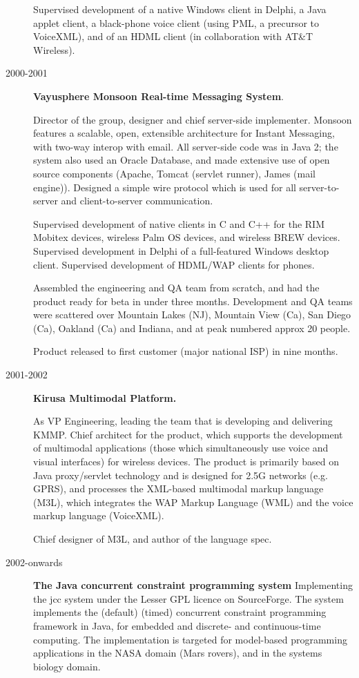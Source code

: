 \documentclass{article}
\begin{document}
\begin{description}
  Supervised development of a native Windows client in Delphi, a Java
  applet client, a black-phone voice client (using PML, a precursor to
  VoiceXML), and of an HDML client (in collaboration with
  AT\&T Wireless).

\item[2000-2001] {\bf Vayusphere Monsoon Real-time Messaging System}.

Director of the group, designer and chief server-side implementer.
  Monsoon features a scalable, open, extensible architecture for
  Instant Messaging, with two-way interop with email. All server-side
  code was in Java 2; the system also used an Oracle Database, and
  made extensive use of open source components (Apache, Tomcat
  (servlet runner), James (mail engine)). Designed a simple wire
  protocol which is used for all server-to-server and client-to-server
  communication.

  Supervised development of native clients in C and C++ for the RIM
  Mobitex devices, wireless Palm OS devices, and wireless BREW
  devices.  Supervised development in Delphi of a full-featured
  Windows desktop client. Supervised development of HDML/WAP clients
  for phones.

  Assembled the engineering and QA team from scratch, and had the
  product ready for beta in under three months.  Development and QA
  teams were scattered over Mountain Lakes (NJ), Mountain View (Ca),
  San Diego (Ca), Oakland (Ca) and Indiana, and at peak numbered
  approx 20 people.

  Product released to first customer (major national ISP) in nine
  months.


 \item[2001-2002] {\bf Kirusa Multimodal Platform.}

 As VP Engineering, leading the team that is developing and delivering
 KMMP.  Chief architect for the product, which supports the development
 of multimodal applications (those which simultaneously use voice and
 visual interfaces) for wireless devices. The product is primarily
 based on Java proxy/servlet technology and is designed for 2.5G
 networks (e.g.{} GPRS), and processes the XML-based multimodal markup
 language (M3L), which integrates the WAP Markup Language (WML) and the
 voice markup language (VoiceXML).

 Chief designer of M3L, and author of the language spec.

 \item[2002-onwards] {\bf The Java concurrent constraint programming
system} Implementing the {\sf jcc} system under the Lesser GPL
licence on SourceForge. The system implements the (default) (timed)
concurrent constraint programming framework in Java, for embedded
and discrete- and continuous-time computing. The implementation is
targeted for model-based programming applications in the NASA domain
(Mars rovers), and in the systems biology domain.

\end{description}
\end{document}
